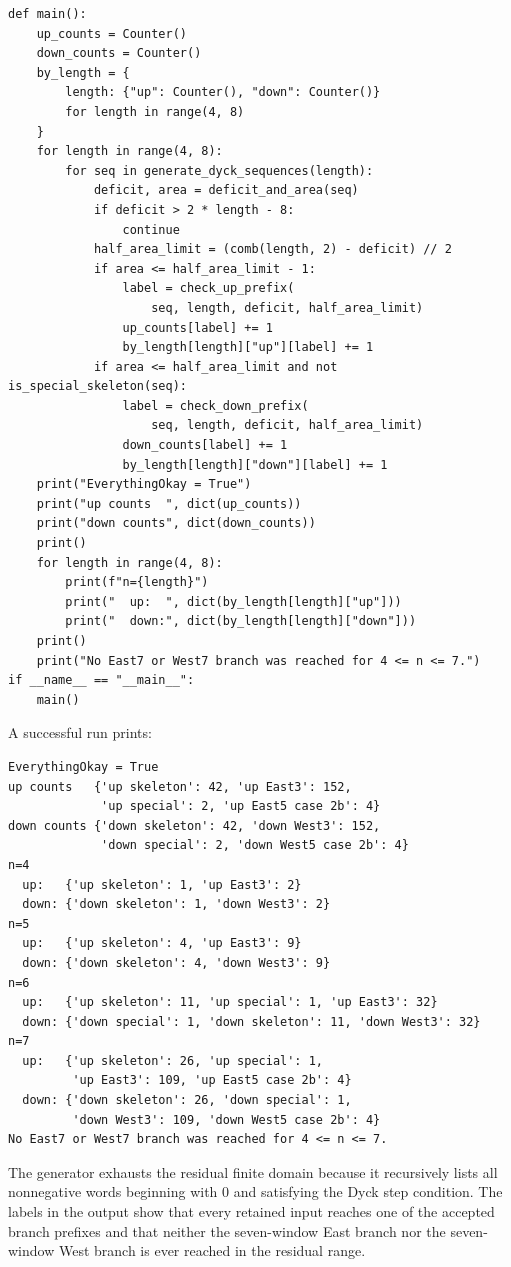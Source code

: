 \documentclass[11pt]{article}
\theoremstyle{plain}
\theoremstyle{definition}
\theoremstyle{remark}
\begin{document}
\begin{lstlisting}
def main():
    up_counts = Counter()
    down_counts = Counter()
    by_length = {
        length: {"up": Counter(), "down": Counter()}
        for length in range(4, 8)
    }
    for length in range(4, 8):
        for seq in generate_dyck_sequences(length):
            deficit, area = deficit_and_area(seq)
            if deficit > 2 * length - 8:
                continue
            half_area_limit = (comb(length, 2) - deficit) // 2
            if area <= half_area_limit - 1:
                label = check_up_prefix(
                    seq, length, deficit, half_area_limit)
                up_counts[label] += 1
                by_length[length]["up"][label] += 1
            if area <= half_area_limit and not is_special_skeleton(seq):
                label = check_down_prefix(
                    seq, length, deficit, half_area_limit)
                down_counts[label] += 1
                by_length[length]["down"][label] += 1
    print("EverythingOkay = True")
    print("up counts  ", dict(up_counts))
    print("down counts", dict(down_counts))
    print()
    for length in range(4, 8):
        print(f"n={length}")
        print("  up:  ", dict(by_length[length]["up"]))
        print("  down:", dict(by_length[length]["down"]))
    print()
    print("No East7 or West7 branch was reached for 4 <= n <= 7.")
if __name__ == "__main__":
    main()
\end{lstlisting}
A successful run prints:
\begin{lstlisting}
EverythingOkay = True
up counts   {'up skeleton': 42, 'up East3': 152,
             'up special': 2, 'up East5 case 2b': 4}
down counts {'down skeleton': 42, 'down West3': 152,
             'down special': 2, 'down West5 case 2b': 4}
n=4
  up:   {'up skeleton': 1, 'up East3': 2}
  down: {'down skeleton': 1, 'down West3': 2}
n=5
  up:   {'up skeleton': 4, 'up East3': 9}
  down: {'down skeleton': 4, 'down West3': 9}
n=6
  up:   {'up skeleton': 11, 'up special': 1, 'up East3': 32}
  down: {'down special': 1, 'down skeleton': 11, 'down West3': 32}
n=7
  up:   {'up skeleton': 26, 'up special': 1,
         'up East3': 109, 'up East5 case 2b': 4}
  down: {'down skeleton': 26, 'down special': 1,
         'down West3': 109, 'down West5 case 2b': 4}
No East7 or West7 branch was reached for 4 <= n <= 7.
\end{lstlisting}

The generator exhausts the residual finite domain because it recursively lists
all nonnegative words beginning with \(0\) and satisfying the Dyck step
condition.  The labels in the output show that every retained input reaches one
of the accepted branch prefixes and that neither the seven-window East branch
nor the seven-window West branch is ever reached in the residual range.
\end{document}
